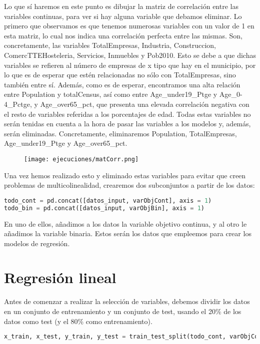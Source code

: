 \documentclass[a4paper,onecolumn]{extarticle}
\begin{document}
\begin{sloppypar}
Lo que sí haremos en este punto es dibujar la matriz de correlación entre las variables continuas, para ver si hay alguna variable que debamos eliminar. Lo 
primero que observamos es que tenemos numerosas variables con un valor de 1 en esta matriz, lo cual nos indica una correlación perfecta entre las mismas. Son,
concretamente, las variables TotalEmpresas, Industria, Construccion, ComercTTEHosteleria, Servicios, Inmuebles y Pob2010. Esto se debe a que dichas variables 
se refieren al número de empresas de x tipo que hay en el municipio, por lo que es de esperar que estén relacionadas no sólo con TotalEmpresas, sino también 
entre sí. Además, como es de esperar, encontramos una alta relación entre Population y totalCensus, así como entre Age\_under19\_Ptge y Age\_0-4\_Pctge, y 
Age\_over65\_pct, que presenta una elevada correlación negativa con el resto de variables referidas a los porcentajes de edad. Todas estas variables no serán
tenidas en cuenta a la hora de pasar las variables a los modelos y, además, serán eliminadas. Concretamente, eliminaremos Population, TotalEmpresas,
Age\_under19\_Ptge y Age\_over65\_pct.

\begin{center}
    \begin{figure}[h!]
        \texttt{[image: ejecuciones/matCorr.png]}
        \label{fig:matCorr}
    \end{figure}
\end{center}

Una vez hemos realizado esto y eliminado estas variables para evitar que creen problemas de multicolinealidad, crearemos dos subconjuntos a partir de los datos:
\begin{lstlisting}[language=Python,numbers=none]
todo_cont = pd.concat([datos_input, varObjCont], axis = 1)
todo_bin = pd.concat([datos_input, varObjBin], axis = 1)
\end{lstlisting}
En uno de ellos, añadimos a los datos la variable objetivo continua, y al otro le añadimos la variable binaria. Estos serán los datos que empleemos para crear
los modelos de regresión.

\section{Regresión lineal}\label{lineal}
Antes de comenzar a realizar la selección de variables, debemos dividir los datos en un conjunto de entrenamiento y un conjunto de test, usando el 20\% de los 
datos como test (y el 80\% como entrenamiento).
\begin{lstlisting}[language=Python, numbers=none]
x_train, x_test, y_train, y_test = train_test_split(todo_cont, varObjCont, test_size = 0.2, random_state = 29112002)
\end{lstlisting}


\end{sloppypar}
\end{document}

